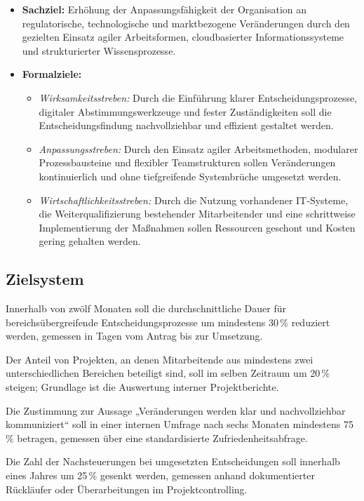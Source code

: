 \documentclass[12pt,a4paper]{article}
\begin{document}
\begin{itemize}
	\item \textbf{Sachziel:} Erhöhung der Anpassungsfähigkeit der Organisation an regulatorische, technologische und marktbezogene Veränderungen durch den gezielten Einsatz agiler Arbeitsformen, cloudbasierter Informationssysteme und strukturierter Wissensprozesse.
\item \textbf{Formalziele:}
\begin{itemize}
	\item \textit{Wirksamkeitsstreben:} Durch die Einführung klarer Entscheidungsprozesse, digitaler Abstimmungswerkzeuge und fester Zuständigkeiten soll die Entscheidungsfindung nachvollziehbar und effizient gestaltet werden.
	
	\item \textit{Anpassungsstreben:} Durch den Einsatz agiler Arbeitsmethoden, modularer Prozessbausteine und flexibler Teamstrukturen sollen Veränderungen kontinuierlich und ohne tiefgreifende Systembrüche umgesetzt werden.
	
	\item \textit{Wirtschaftlichkeitsstreben:} Durch die Nutzung vorhandener IT-Systeme, die Weiterqualifizierung bestehender Mitarbeitender und eine schrittweise Implementierung der Maßnahmen sollen Ressourcen geschont und Kosten gering gehalten werden.
\end{itemize}
\end{itemize}



\subsection{Zielsystem}

Innerhalb von zwölf Monaten soll die durchschnittliche Dauer für bereichsübergreifende Entscheidungsprozesse um mindestens 30\,\% reduziert werden, gemessen in Tagen vom Antrag bis zur Umsetzung.

\noindent Der Anteil von Projekten, an denen Mitarbeitende aus mindestens zwei unterschiedlichen Bereichen beteiligt sind, soll im selben Zeitraum um 20\,\% steigen; Grundlage ist die Auswertung interner Projektberichte.

\noindent Die Zustimmung zur Aussage „Veränderungen werden klar und nachvollziehbar kommuniziert“ soll in einer internen Umfrage nach sechs Monaten mindestens 75\,\% betragen, gemessen über eine standardisierte Zufriedenheitsabfrage.

\noindent Die Zahl der Nachsteuerungen bei umgesetzten Entscheidungen soll innerhalb eines Jahres um 25\,\% gesenkt werden, gemessen anhand dokumentierter Rückläufer oder Überarbeitungen im Projektcontrolling.
\end{document}
